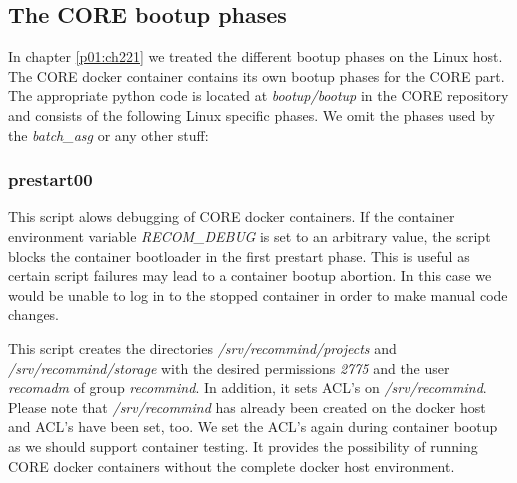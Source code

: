 		\subsection{The CORE bootup phases}
		In chapter \ref{p01:ch221} we treated the different bootup phases on the Linux host. The CORE docker container contains its own bootup phases for the CORE part. The appropriate python code is located at \emph{bootup/bootup} in the CORE repository and consists of the following Linux specific phases. We omit the phases used by the \emph{batch\_asg} or any other stuff:
			
			\subsubsection{prestart00}
			\begin{description}\sloppy
				\item[check debug environment] This script alows debugging of CORE docker containers. If the container environment variable \emph{RECOM\_DEBUG} is set to an arbitrary value, the script blocks the container bootloader in the first prestart phase. This is useful as certain script failures may lead to a container bootup abortion. In this case we would be unable to log in to the stopped container in order to make manual code changes.
				\item[setup directories] This script creates the directories \emph{/srv/recommind/projects} and \emph{/srv/recommind/storage} with the desired permissions \emph{2775} and the user \emph{recomadm} of group \emph{recommind}. In addition, it sets ACL's on \emph{/srv/recommind}. Please note that \emph{/srv/recommind} has already been created on the docker host and ACL's have been set, too. We set the ACL's again during container bootup as we should support container testing. It provides the possibility of running CORE docker containers without the complete docker host environment.
			\end{description}
